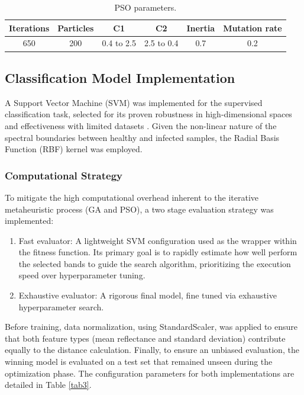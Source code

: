 \documentclass[ASNA,twocolumn]{USG}
\begin{document}
\begin{table}[!ht]
\centering
    \small
    \setlength{\tabcolsep}{3pt}
    \caption{PSO parameters.\label{tab2}}
    \begin{tabular}{cccccc}
        \toprule
        \textbf{Iterations} & \textbf{Particles} & \textbf{C1} & \textbf{C2} & \textbf{Inertia} & \textbf{Mutation rate}\\
        \midrule
        650 & 200 & 0.4 to 2.5 & 2.5 to 0.4 & 0.7 & 0.2\\
        \bottomrule
    \end{tabular}
\end{table}

\subsection{Classification Model Implementation}
A Support Vector Machine (SVM) was implemented for the supervised classification task, selected for its proven robustness in high-dimensional spaces and effectiveness with limited datasets \cite{nagasubramanian_hyperspectral_2018, musci_ice_2020}. 
Given the non-linear nature of the spectral boundaries between healthy and infected samples, the Radial Basis Function (RBF) kernel was employed.

\subsubsection{Computational Strategy}
To mitigate the high computational overhead inherent to the iterative metaheuristic process (GA and PSO), a two stage evaluation strategy was implemented:
\begin{enumerate}
    \item Fast evaluator: A lightweight SVM configuration used as the wrapper within the fitness function. Its primary goal is to rapidly estimate how well perform the selected bands to guide the search algorithm, prioritizing the execution speed over hyperparameter tuning.
    \item Exhaustive evaluator: A rigorous final model, fine tuned via exhaustive hyperparameter search.
\end{enumerate}

Before training, data normalization, using StandardScaler, was applied to ensure that both feature types (mean reflectance and standard deviation) contribute equally to the distance calculation. 
Finally, to ensure an unbiased evaluation, the winning model is evaluated on a test set that remained unseen during the optimization phase. 
The configuration parameters for both implementations are detailed in Table \ref{tab3}.
\end{document}
